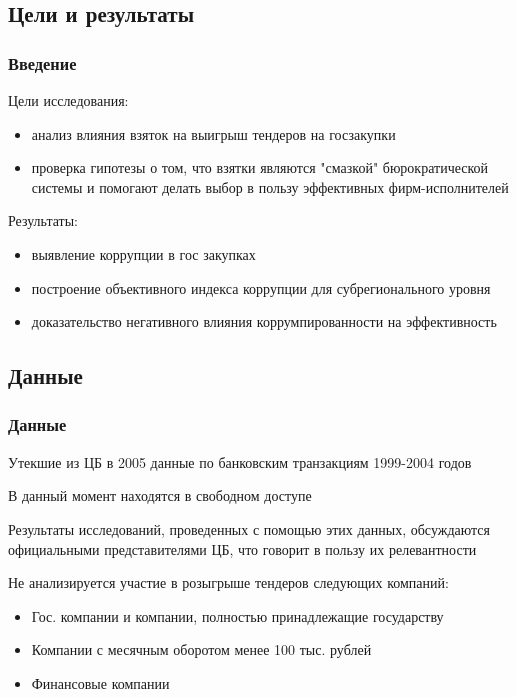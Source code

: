 \subsection{Цели и результаты}

\begin{frame}

\frametitle{Введение}
Цели исследования:\\ 

\begin{itemize}
\item анализ влияния взяток на выигрыш тендеров на госзакупки

\item проверка гипотезы о том, 
что взятки являются "смазкой" бюрократической системы и помогают делать выбор в пользу
эффективных фирм-исполнителей
\end{itemize}

\vspace{5mm}

Результаты:
\begin{itemize}

\item выявление коррупции в гос закупках

\item построение объективного индекса
коррупции для субрегионального уровня

\item доказательство негативного влияния коррумпированности на
эффективность

\end{itemize}

\end{frame}



\subsection{Данные}

\begin{frame}

\frametitle{Данные}
Утекшие из ЦБ в 2005 данные по банковским транзакциям 1999-2004 годов
\vspace{3mm}

В данный момент находятся в свободном доступе
\vspace{3mm}

Результаты исследований, проведенных с помощью этих данных, 
обсуждаются официальными представителями ЦБ,
что говорит в пользу их релевантности
\vspace{3mm}

Не анализируется участие в розыгрыше тендеров следующих компаний:
\begin{itemize}
\item Гос. компании и компании, полностью принадлежащие государству
\item Компании с месячным оборотом менее 100 тыс. рублей
\item Финансовые компании
\end{itemize}

\end{frame}